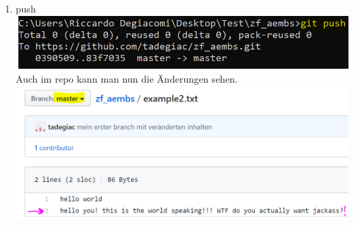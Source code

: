 \documentclass[a4paper, 8pt]{extarticle}
\begin{document}
\begin{multicols*}{3}
\begin{enumerate}
                    \item   push\\
                                \includegraphics[width=1\linewidth, left]{img/git_merge_push.PNG}\\
                            Auch im repo kann man nun die Änderungen sehen.\\
                                \includegraphics[width=1\linewidth, left]{img/git_merge_master_repo.PNG}\\                
                 \end{enumerate}


\end{multicols*}
\end{document}
